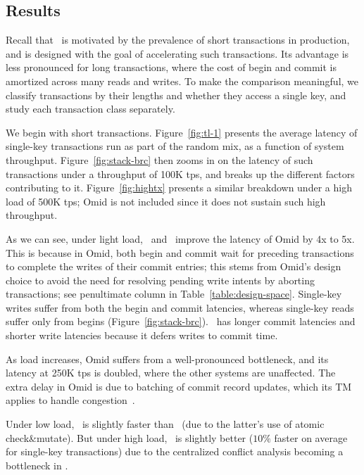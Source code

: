 \subsection{Results}
\label{ssec:results}

%
Recall that \sys\ is motivated by the prevalence of short transactions in production, and is designed with
the goal of accelerating such transactions.
Its advantage is less pronounced for long transactions, where the cost of begin and commit is amortized
across many reads and writes.
To make the comparison meaningful, we classify transactions by their lengths and whether they
access a single key, and study each transaction class separately. 

We begin with short transactions. 
Figure~\ref{fig:tl-1} presents the average latency of single-key transactions run as part of the random mix,
as a function of {system} throughput.
Figure~\ref{fig:stack-brc}  then zooms in on the latency of such transactions under 
a throughput of 100K tps, and breaks up the different factors contributing to it. 
Figure~\ref{fig:hightx}  presents a similar breakdown under a high load of 500K tps; Omid 
is not included since it does not sustain such high throughput.

As we can see, under light load, \sysll\ and \syspc\ improve the latency of Omid by 4x to 5x.
This is because in Omid, both begin and commit wait for preceding transactions to complete the writes of 
their commit entries; this stems from Omid's design choice to avoid the need for resolving pending write intents
by aborting transactions; see penultimate column in Table~\ref{table:design-space}. 
Single-key writes suffer from both the begin and commit latencies, whereas single-key reads  
suffer only from begins (Figure~\ref{fig:stack-brc}). \syspc\ has longer commit latencies and shorter write latencies
because it defers writes to commit time.

As load increases, Omid suffers from a well-pronounced bottleneck, and its latency at 250K tps is doubled, where the other systems
are unaffected. The extra delay in Omid is due to batching of commit record updates, 
which its TM applies to handle congestion~\cite{Omid2017}. 

Under low load, \sysll\ is slightly faster than \syspc\ (due to the latter's use of atomic check\&mutate). 
But under high load, \syspc\ is slightly better ($10\%$ faster on average for single-key transactions)   
due to the centralized conflict analysis becoming a bottleneck in \sysll.

